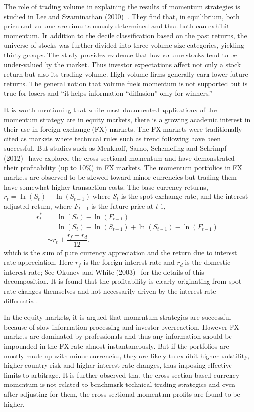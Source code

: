 The role of trading volume in explaining the results of momentum strategies is studied in Lee and Swaminathan (2000)~\cite{lee2000}. They find that, in equilibrium, both price and volume are simultaneously determined and thus both can exhibit momentum. In addition to the decile classification based on the past returns, the universe of stocks was further divided into three volume size categories, yielding thirty groups. The study provides evidence that low volume stocks tend to be under-valued by the market. Thus investor expectations affect not only a stock return but also its trading volume. High volume firms generally earn lower future returns. The general notion that volume fuels momentum is not supported but is true for losers and ``it helps information ``diffusion'' only for winners.''


It is worth mentioning that while most documented applications of the momentum strategy are in equity markets, there is a growing academic interest in their use in foreign exchange (FX) markets. The FX markets were traditionally cited as markets where technical rules such as trend following have been successful. But studies such as Menkhoff, Sarno, Schemeling and Schrimpf (2012)~\cite{menkhoff2012} have explored the cross-sectional momentum and have demonstrated their profitability (up to 10\%) in FX markets. The momentum portfolios in FX markets are observed to be skewed toward minor currencies but trading them have somewhat higher transaction costs. The base currency returns, $r_t= \ln(S_t) - \ln(S_{t-1})$ where $S_t$ is the spot exchange rate, and the interest-adjusted return, where $F_{t-1}$ is the future price at $t$-1,
	\begin{equation}
	\begin{split}
	r_t^* &= \ln(S_t) - \ln(F_{t-1}) \\
	&= \ln(S_t) - \ln(S_{t-1}) + \ln(S_{t-1}) - \ln(F_{t-1}) \\
	&\sim r_t + \dfrac{r_f - r_d}{12},
	\end{split}
	\end{equation}
which is the sum of pure currency appreciation and the return due to interest rate appreciation. Here $r_f$ is the foreign interest rate and $r_d$ is the domestic interest rate; See Okunev and White (2003)~\cite{okunev2003} for the details of this decomposition. It is found that the profitability is clearly originating from spot rate changes themselves and not necessarily driven by the interest rate differential.


In the equity markets, it is argued that momentum strategies are successful because of slow information processing and investor overreaction. However FX markets are dominated by professionals and thus any information should be impounded in the FX rate almost instantaneously. But if the portfolios are mostly made up with minor currencies, they are likely to exhibit higher volatility, higher country risk and higher interest-rate changes, thus imposing effective limits to arbitrage. It is further observed that the cross-section based currency momentum is not related to benchmark technical trading strategies and even after adjusting for them, the cross-sectional momentum profits are found to be higher. \twomedskip


